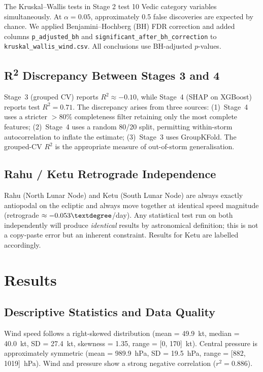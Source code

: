 \documentclass[12pt,a4paper]{article}
\begin{document}
The Kruskal--Wallis tests in Stage 2 test 10 Vedic category variables simultaneously.
At $\alpha = 0.05$, approximately 0.5 false discoveries are expected by chance.
We applied Benjamini--Hochberg (BH) FDR correction and added columns
\texttt{p\_adjusted\_bh} and \texttt{significant\_after\_bh\_correction} to
\texttt{kruskal\_wallis\_wind.csv}. All conclusions use BH-adjusted $p$-values.

\subsection{R\textsuperscript{2} Discrepancy Between Stages 3 and 4}

Stage~3 (grouped CV) reports $R^2 \approx -0.10$, while Stage~4 (SHAP on XGBoost)
reports test $R^2 = 0.71$. The discrepancy arises from three sources:
(1)~Stage~4 uses a stricter $> 80\%$ completeness filter retaining only the most
complete features; (2)~Stage~4 uses a random 80/20 split, permitting within-storm
autocorrelation to inflate the estimate; (3)~Stage~3 uses GroupKFold.
The grouped-CV $R^2$ is the appropriate measure of out-of-storm generalisation.

\subsection{Rahu / Ketu Retrograde Independence}

Rahu (North Lunar Node) and Ketu (South Lunar Node) are always exactly antiopodal on
the ecliptic and always move together at identical speed magnitude (retrograde
$\approx -0.053\textdegree$/day). Any statistical test run on both independently will
produce \emph{identical} results by astronomical definition; this is not a
copy-paste error but an inherent constraint. Results for Ketu are labelled accordingly.

\section{Results}

\subsection{Descriptive Statistics and Data Quality}

Wind speed follows a right-skewed distribution (mean = 49.9~kt, median = 40.0~kt,
SD = 27.4~kt, skewness = 1.35, range = [0, 170]~kt). Central pressure is
approximately symmetric (mean = 989.9~hPa, SD = 19.5~hPa, range = [882, 1019]~hPa).
Wind and pressure show a strong negative correlation ($r^2 = 0.886$).
\end{document}
